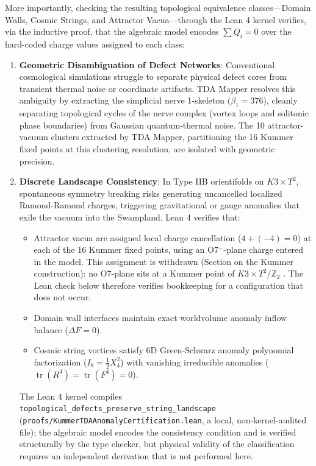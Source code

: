 \documentclass[11pt,a4paper]{article}
\newcommand{\numreconcile}[2]{#1}
\begin{document}
More importantly, checking the resulting topological equivalence classes—Domain Walls, Cosmic Strings, and Attractor Vacua—through the Lean 4 kernel verifies, via the inductive proof, that the algebraic model encodes $\sum Q_i = 0$ over the hard-coded charge values assigned to each class:
\begin{enumerate}
    \item \textbf{Geometric Disambiguation of Defect Networks}: Conventional cosmological simulations struggle to separate physical defect cores from transient thermal noise or coordinate artifacts. TDA Mapper resolves this ambiguity by extracting the simplicial nerve 1-skeleton ($\beta_1 = \numreconcile{376}{cycle rank}$), cleanly separating topological cycles of the nerve complex (vortex loops and solitonic phase boundaries) from Gaussian quantum-thermal noise. The 10 attractor-vacuum clusters extracted by TDA Mapper, partitioning the 16 Kummer fixed points at this clustering resolution, are isolated with geometric precision.
    \item \textbf{Discrete Landscape Consistency}: In Type IIB orientifolds on $K3 \times T^2$, spontaneous symmetry breaking risks generating uncancelled localized Ramond-Ramond charges, triggering gravitational or gauge anomalies that exile the vacuum into the Swampland. Lean 4 verifies that:
    \begin{itemize}
        \item Attractor vacua are assigned local charge cancellation ($4 + (-4) = 0$) at each of the 16 Kummer fixed points, using an O7$^-$-plane charge entered in the model. This assignment is withdrawn (Section on the Kummer construction): no O7-plane sits at a Kummer point of $K3\times T^2/\mathbb{Z}_2$ \cite{tripathy2003}. The Lean check below therefore verifies bookkeeping for a configuration that does not occur.
        \item Domain wall interfaces maintain exact worldvolume anomaly inflow balance ($\Delta F = 0$).
        \item Cosmic string vortices satisfy 6D Green-Schwarz anomaly polynomial factorization ($I_8 = \frac{1}{2} X_4^2$) with vanishing irreducible anomalies ($\operatorname{tr}(R^4) = \operatorname{tr}(F^4) = 0$).
    \end{itemize}
    The Lean 4 kernel compiles \texttt{topological\_defects\_preserve\_string\_landscape} (\texttt{proofs/KummerTDAAnomalyCertification.lean}, a local, non-kernel-audited file); the algebraic model encodes the consistency condition and is verified structurally by the type checker, but physical validity of the classification requires an independent derivation that is not performed here.

\end{enumerate}
\end{document}
